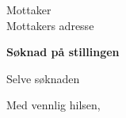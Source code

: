 \documentclass[12pt]{letter}
\begin{document}
\begin{letter}{Mottaker \\ Mottakers adresse}
        \opening{\textbf{Søknad på stillingen}}

        Selve søknaden


        \closing{Med vennlig hilsen,}

\end{letter}
\end{document}

